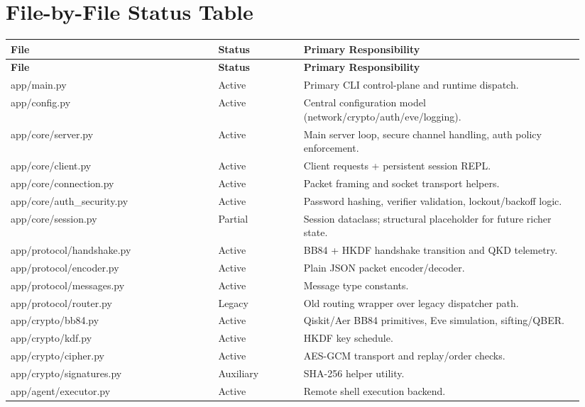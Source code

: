 \documentclass[11pt,a4paper]{article}
\begin{document}
\section{File-by-File Status Table}

\renewcommand{\arraystretch}{1.2}
\begin{longtable}{>{\ttfamily}p{0.34\linewidth} p{0.14\linewidth} p{0.46\linewidth}}
\toprule
\textnormal{\textbf{File}} & \textbf{Status} & \textbf{Primary Responsibility} \\
\midrule
\endfirsthead
\toprule
\textnormal{\textbf{File}} & \textbf{Status} & \textbf{Primary Responsibility} \\
\midrule
\endhead
app/main.py & Active & Primary CLI control-plane and runtime dispatch. \\
app/config.py & Active & Central configuration model (network/crypto/auth/eve/logging). \\
app/core/server.py & Active & Main server loop, secure channel handling, auth policy enforcement. \\
app/core/client.py & Active & Client requests + persistent session REPL. \\
app/core/connection.py & Active & Packet framing and socket transport helpers. \\
app/core/auth\_security.py & Active & Password hashing, verifier validation, lockout/backoff logic. \\
app/core/session.py & Partial & Session dataclass; structural placeholder for future richer state. \\
app/protocol/handshake.py & Active & BB84 + HKDF handshake transition and QKD telemetry. \\
app/protocol/encoder.py & Active & Plain JSON packet encoder/decoder. \\
app/protocol/messages.py & Active & Message type constants. \\
app/protocol/router.py & Legacy & Old routing wrapper over legacy dispatcher path. \\
app/crypto/bb84.py & Active & Qiskit/Aer BB84 primitives, Eve simulation, sifting/QBER. \\
app/crypto/kdf.py & Active & HKDF key schedule. \\
app/crypto/cipher.py & Active & AES-GCM transport and replay/order checks. \\
app/crypto/signatures.py & Auxiliary & SHA-256 helper utility. \\
app/agent/executor.py & Active & Remote shell execution backend. \\

\end{longtable}
\end{document}
